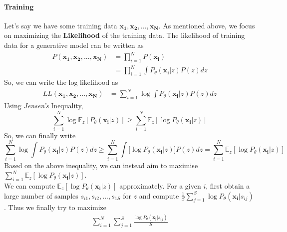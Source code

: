 \documentclass[12pt]{article}
\begin{document}
\paragraph{Training} Let's say we have some training data ${\mathbf{x_{1}}, \mathbf{x_{2}}, ..., \mathbf{x_{N}}}$. As mentioned above, we focus on maximizing the \textbf{Likelihood} of the training data. The likelihood of training data for a generative model can be written as
\begin{align*}
P(\mathbf{x_{1}}, \mathbf{x_{2}}, ..., \mathbf{x_{N}}) &= \prod_{i=1}^{N}P(\mathbf{x_{i}})\\
&= \prod_{i=1}^{N} \int{P_{\theta}(\mathbf{x_{i}}|z)P(z)dz}
\end{align*}
So, we can write the log likelihood as
\begin{align*}
    LL(\mathbf{x_{1}}, \mathbf{x_{2}, ..., \mathbf{x_{N}}}) &= \sum_{i=1}^{N}\log\int{P_{\theta}(\mathbf{x_{i}}|z)P(z)dz}
\end{align*}
Using \textit{Jensen's} Inequality, 
\begin{equation*}
    \sum_{i=1}^{N}\log{\mathbb{E}_{z}[P_{\theta}(\mathbf{x_{i}}|z)]} \geq \sum_{i=1}^{N}\mathbb{E}_{z}[\log{P_{\theta}(\mathbf{x_{i}}|z)}]
\end{equation*}
So, we can finally write 
\begin{equation*}
    \sum_{i=1}^{N}\log\int{P_{\theta}(\mathbf{x_{i}}|z)P(z)dz} \geq \sum_{i=1}^{N}\int[\log{P_{\theta}(\mathbf{x_{i}}|z)]P(z)dz} = \sum_{i=1}^{N}\mathbb{E}_{z}[\log{P_{\theta}(\mathbf{x_{i}}|z)}]
\end{equation*}
Based on the above inequality, we can instead aim to maximise $\sum_{i=1}^{N}\mathbb{E}_{z}[\log{P_{\theta}(\mathbf{x_{i}}|z)}]$.\\
We can compute $\mathbb{E}_{z}[\log{P_{\theta}(\mathbf{x_{i}}|z)}]$ approximately. For a given $i$, first obtain a large number of samples ${s_{i1}, s_{i2}, ..., s_{1S}}$ for $z$ and compute $\frac{1}{S}\sum_{j=1}^{S}\log P_{\theta}(\mathbf{x_{i}}|s_{ij})$.
Thus we finally try to maximize 
\begin{align*}
    \sum_{i=1}^{N}\sum_{j=1}^{S}\frac{\log{P_{\theta}(\mathbf{x_{i}}|s_{ij})}}{S}
\end{align*}
\end{document}

